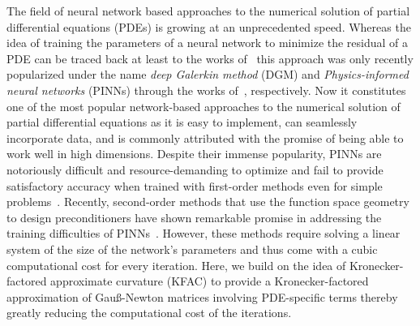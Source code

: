 
The field of neural network based approaches to the numerical solution of partial differential equations (PDEs) is growing at an unprecedented speed. %
Whereas the idea of training the parameters of a neural network to minimize the residual of a PDE can be traced back at least to the works of~\cite{dissanayake1994neural, lagaris1998artificial} this approach was only recently popularized under the name \emph{deep Galerkin method} (DGM) and \emph{Physics-informed neural networks} (PINNs) through the works of~\cite{sirignano2018dgm, raissi2019physics}, respectively.  
Now it constitutes one of the most popular network-based approaches to the numerical solution of partial differential equations as it is easy to implement, can seamlessly incorporate data, and is commonly attributed with the promise of being able to work well in high dimensions. 
Despite their immense popularity, PINNs are notoriously difficult and resource-demanding to optimize \citep{wang2021understanding} and fail to provide satisfactory accuracy when trained with first-order methods even for simple problems~\cite{zeng2022competitive, muller2023achieving}. 
Recently, second-order methods that use the function space geometry to design preconditioners have shown remarkable promise in addressing the training difficulties of PINNs~\citep{zeng2022competitive, muller2023achieving, de2023operator,jnini2024gauss, muller2024optimization}. 
However, these methods require solving a linear system of the size of the network's parameters and thus come with a cubic computational cost for every iteration. %
Here, we build on the idea of Kronecker-factored approximate curvature (KFAC) to provide a %
Kronecker-factored approximation of Gauß-Newton matrices involving PDE-specific terms thereby greatly reducing the computational cost of the iterations. %

